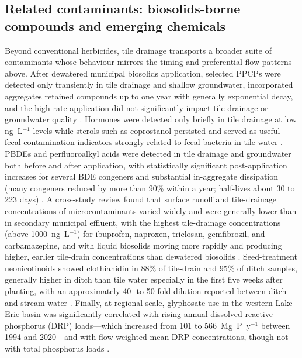 \documentclass[11pt]{article}
\begin{document}
\subsection{Related contaminants: biosolids-borne compounds and emerging chemicals}
Beyond conventional herbicides, tile drainage transports a broader suite of contaminants whose behaviour mirrors the timing and preferential-flow patterns above. After dewatered municipal biosolids application, selected PPCPs were detected only transiently in tile drainage and shallow groundwater, incorporated aggregates retained compounds up to one year with generally exponential decay, and the high-rate application did not significantly impact tile drainage or groundwater quality \parencite{Gottschall2012}. Hormones were detected only briefly in tile drainage at low ng~L$^{-1}$ levels while sterols such as coprostanol persisted and served as useful fecal-contamination indicators strongly related to fecal bacteria in tile water \parencite{Gottschall2013}. PBDEs and perfluoroalkyl acids were detected in tile drainage and groundwater both before and after application, with statistically significant post-application increases for several BDE congeners and substantial in-aggregate dissipation (many congeners reduced by more than 90\% within a year; half-lives about 30 to 223 days) \parencite{Gottschall2017}. A cross-study review found that surface runoff and tile-drainage concentrations of microcontaminants varied widely and were generally lower than in secondary municipal effluent, with the highest tile-drainage concentrations (above 1000~ng~L$^{-1}$) for ibuprofen, naproxen, triclosan, gemfibrozil, and carbamazepine, and with liquid biosolids moving more rapidly and producing higher, earlier tile-drain concentrations than dewatered biosolids \parencite{Ghirardini2019}. Seed-treatment neonicotinoids showed clothianidin in 88\% of tile-drain and 95\% of ditch samples, generally higher in ditch than tile water especially in the first five weeks after planting, with an approximately 40- to 50-fold dilution reported between ditch and stream water \parencite{Schaafsma2019}. Finally, at regional scale, glyphosate use in the western Lake Erie basin was significantly correlated with rising annual dissolved reactive phosphorus (DRP) loads---which increased from 101 to 566~Mg~P~y$^{-1}$ between 1994 and 2020---and with flow-weighted mean DRP concentrations, though not with total phosphorus loads \parencite{Spiese2023}.

\printbibliography
\end{document}
